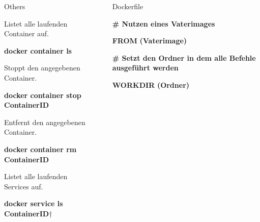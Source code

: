 \documentclass[final]{beamer}
\newlength{\sepwid}
\newlength{\onecolwid}
\newlength{\specialcolwid}
\begin{document}
\begin{frame}
\begin{columns}[t]
\begin{column}{\specialcolwid}
\begin{block}{Others}

\par Listet alle laufenden Container auf.
\par \textbf{docker container ls}

\vspace{1cm}
\par Stoppt den angegebenen Container.
\par \par \textbf{docker container stop} \textcolor{docker-lb}{\textbf{ContainerID}}

\vspace{1cm}
\par Entfernt den angegebenen Container.
\par \par \textbf{docker container rm} \textcolor{docker-lb}{\textbf{ContainerID}}

\vspace{1cm}
\par Listet alle laufenden Services auf.
\par \par \textbf{docker service ls} \textcolor{docker-lb}{\textbf{ContainerID}}†

\end{block}

\end{column} %

\begin{column}{\sepwid}\end{column} %

\begin{column}{\onecolwid} %





\begin{block}{Dockerfile}

\par \textcolor{docker-green}{\textbf{\# Nutzen eines Vaterimages}}
\par \textcolor{docker-pu}{\textbf{FROM}} \textcolor{docker-red}{\textbf{(Vaterimage)}}

\vspace{1cm}
\par \textcolor{docker-green}{\textbf{\# Setzt den Ordner in dem alle Befehle ausgeführt werden}}
\par \textcolor{docker-pu}{\textbf{WORKDIR}} \textcolor{docker-red}{\textbf{(Ordner)}}


\end{block}
\end{column}
\end{columns}
\end{frame}
\end{document}
